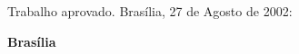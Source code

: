 \thispagestyle{empty}

\begin{center}
\textbf{\autor} \\
\vspace{3.75cm} %
\Large\textbf{\titulo} \\
\end{center}
 
\vspace{2cm}  %
\begin{flushright}
\begin{minipage}{7.5cm}
 \parbox[t]{7.5cm}{\naturezatrabalho}
\end{minipage}
\end{flushright}
 
 \vspace*{1.5cm}
  \noindent Trabalho aprovado. Brasília, 27 de Agosto de 2002:
  
\vspace{0.7cm}
\assinatura{\textbf{\profvv} \\ \orienvv} 
\assinatura{\textbf{\coprofvv} \\ \coorienvv}
\assinatura{\textbf{\coprofvv} \\  \coorienvv}


\vspace{1cm}
\begin{center}
{\bf{Brasília} \\ }
\bf{\ano}
\end{center}